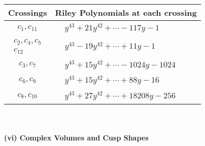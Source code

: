 \documentclass[1p]{elsarticle_modified}
\theoremstyle{definition}
\begin{document}
\begin{tabular}{m{50pt}|m{274pt}}
Crossings & \hspace{64pt}Riley Polynomials at each crossing \\
\hline $$\begin{aligned}c_{1},c_{11}\end{aligned}$$&$\begin{aligned}
&y^{43}+21 y^{42}+\cdots-117 y-1
\end{aligned}$\\
\hline $$\begin{aligned}c_{2},c_{4},c_{5}\\c_{12}\end{aligned}$$&$\begin{aligned}
&y^{43}-19 y^{42}+\cdots+11 y-1
\end{aligned}$\\
\hline $$\begin{aligned}c_{3},c_{7}\end{aligned}$$&$\begin{aligned}
&y^{43}+15 y^{42}+\cdots-1024 y-1024
\end{aligned}$\\
\hline $$\begin{aligned}c_{6},c_{9}\end{aligned}$$&$\begin{aligned}
&y^{43}+15 y^{42}+\cdots+88 y-16
\end{aligned}$\\
\hline $$\begin{aligned}c_{8},c_{10}\end{aligned}$$&$\begin{aligned}
&y^{43}+27 y^{42}+\cdots+18208 y-256
\end{aligned}$\\
\hline
\end{tabular}\\~\\
\newpage\flushleft \textbf{(vi) Complex Volumes and Cusp Shapes}
\end{document}

